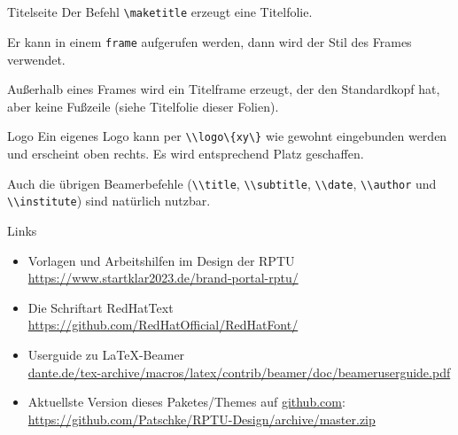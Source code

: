 \documentclass[german,10pt,xcolor=colortbl,compress
]{beamer}
\begin{document}
\subsection*{}
\begin{frame}[fragile]{Titelseite}
	Der Befehl \lstinline|\maketitle| erzeugt eine Titelfolie.

	Er kann in einem \lstinline|frame| aufgerufen werden, dann wird der Stil des Frames verwendet.

	Außerhalb eines Frames wird ein Titelframe erzeugt, der den Standardkopf hat, aber keine Fußzeile (siehe Titelfolie dieser Folien).
\end{frame}
\begin{frame}{Logo}
	Ein eigenes Logo kann per \lstinline|\\logo\{xy\}| wie gewohnt eingebunden werden und erscheint oben rechts. Es wird entsprechend Platz geschaffen.\par
	Auch die übrigen Beamerbefehle (\lstinline|\\title|, \lstinline|\\subtitle|, \lstinline|\\date|, \lstinline|\\author| und \lstinline|\\institute|) sind natürlich nutzbar.
\end{frame}
\logo{}
\begin{frame}{Links}
	\begin{itemize}
		\item Vorlagen und Arbeitshilfen im Design der RPTU\\ \href{https://www.startklar2023.de/brand-portal-rptu/}{https://www.startklar2023.de/brand-portal-rptu/}
		\item Die Schriftart RedHatText\\
		      \href{https://github.com/RedHatOfficial/RedHatFont/}{https://github.com/RedHatOfficial/RedHatFont/}
		\item Userguide zu \LaTeX-Beamer\\ \href{ftp://ftp.dante.de/tex-archive/macros/latex/contrib/beamer/doc/beameruserguide.pdf}{dante.de/tex-archive/macros/latex/contrib/beamer/doc/beameruserguide.pdf}
		\item Aktuellste Version dieses Paketes/Themes auf \href{http://github.com}{github.com}:\\
		      \href{https://github.com/Patschke/RPTU-Design/archive/master.zip}{https://github.com/Patschke/RPTU-Design/archive/master.zip}
	\end{itemize}
\end{frame}
\end{document}
